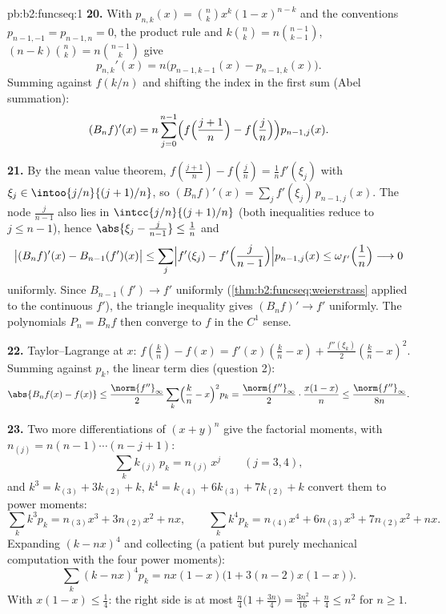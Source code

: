 \begin{solution}{pb:b2:funcseq:1}
\textbf{20.} With $p_{n,k}(x) = \binom nk x^k(1-x)^{n-k}$ and
the conventions $p_{n-1,-1} = p_{n-1,n} = 0$, the product rule
and $k\binom nk = n\binom{n-1}{k-1}$, $(n-k)\binom nk =
n\binom{n-1}{k}$ give
\[
p_{n,k}'(x) = n\bigl(p_{n-1,k-1}(x) - p_{n-1,k}(x)\bigr) .
\]
Summing against $f(k/n)$ and shifting the index in the first
sum (Abel summation):
\[
(B_nf)'(x) = n\sum_{j=0}^{n-1}\Bigl(f\Bigl(\frac{j+1}n\Bigr)
- f\Bigl(\frac jn\Bigr)\Bigr)p_{n-1,j}(x) .
\]

\textbf{21.} By the mean value theorem, $f(\frac{j+1}n) -
f(\frac jn) = \frac1n f'(\xi_j)$ with $\xi_j \in
\intoo{j/n}{(j+1)/n}$, so $(B_nf)'(x) = \sum_j
f'(\xi_j)\,p_{n-1,j}(x)$. The node $\frac{j}{n-1}$ also lies in
$\intcc{j/n}{(j+1)/n}$ (both inequalities reduce to $j \leq
n-1$), hence $\abs{\xi_j - \frac j{n-1}} \leq \frac1n$ and
\[
\bigl|(B_nf)'(x) - B_{n-1}(f')(x)\bigr|
\leq \sum_j\Bigl|f'(\xi_j) -
f'\Bigl(\frac{j}{n-1}\Bigr)\Bigr| p_{n-1,j}(x)
\leq \omega_{f'}\Bigl(\frac1n\Bigr) \longrightarrow 0
\]
uniformly. Since $B_{n-1}(f') \to f'$ uniformly
(\cref{thm:b2:funcseq:weierstrass} applied to the continuous
$f'$), the triangle inequality gives $(B_nf)' \to f'$
uniformly. The polynomials $P_n = B_nf$ then converge to $f$
in the $C^1$ sense.

\textbf{22.} Taylor--Lagrange at $x$: $f(\frac kn) - f(x) =
f'(x)(\frac kn - x) + \frac{f''(\xi_k)}2(\frac kn - x)^2$.
Summing against $p_k$, the linear term dies (question 2):
\[
\abs{B_nf(x) - f(x)}
\leq \frac{\norm{f''}_\infty}{2}\sum_k\Bigl(\frac kn -
x\Bigr)^2p_k
= \frac{\norm{f''}_\infty}{2}\cdot\frac{x(1-x)}{n}
\leq \frac{\norm{f''}_\infty}{8n} .
\]

\textbf{23.} Two more differentiations of $(x+y)^n$ give the
factorial moments, with $n_{(j)} = n(n-1)\cdots(n-j+1)$:
\[
\sum_k k_{(j)}\,p_k = n_{(j)}\,x^j \qquad (j = 3, 4),
\]
and $k^3 = k_{(3)} + 3k_{(2)} + k$, $k^4 = k_{(4)} + 6k_{(3)} +
7k_{(2)} + k$ convert them to power moments:
\[
\sum_k k^3p_k = n_{(3)}x^3 + 3n_{(2)}x^2 + nx,
\qquad
\sum_k k^4p_k = n_{(4)}x^4 + 6n_{(3)}x^3 + 7n_{(2)}x^2 + nx .
\]
Expanding $(k - nx)^4$ and collecting (a patient but purely
mechanical computation with the four power moments):
\[
\sum_k(k-nx)^4p_k = nx(1-x)\bigl(1 + 3(n-2)x(1-x)\bigr) .
\]
With $x(1-x) \leq \frac14$: the right side is at most
$\frac n4\bigl(1 + \frac{3n}4\bigr) = \frac{3n^2}{16} +
\frac n4 \leq n^2$ for $n \geq 1$.


\end{solution}
